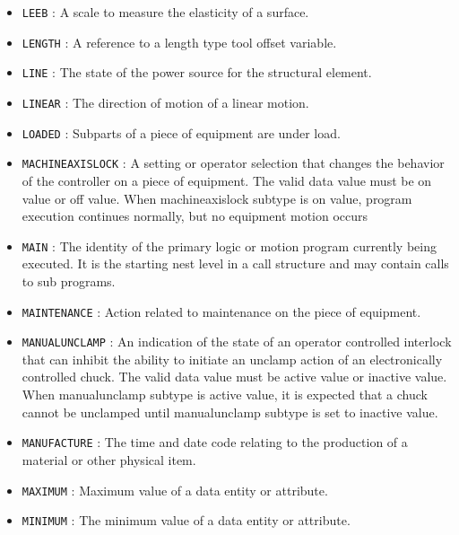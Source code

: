 \begin{itemize}
\item \texttt{LEEB} : A scale to measure the elasticity of a surface. 

\item \texttt{LENGTH} : A reference to a length type tool offset variable. 

\item \texttt{LINE} : The state of the power source for the structural element. 

\item \texttt{LINEAR} : The direction of motion of a linear motion. 

\item \texttt{LOADED} : Subparts of a piece of equipment are under load. 

\item \texttt{MACHINE\textunderscore AXIS\textunderscore LOCK} : A setting or operator selection that changes the behavior of the controller on a piece of equipment. 
 The valid data value must be on value or off value. 
 When machineaxislock subtype is on value, program execution continues normally, but no equipment motion occurs  

\item \texttt{MAIN} : The identity of the primary logic or motion program currently being executed. It is the starting nest level in a call structure and may contain calls to sub programs. 

\item \texttt{MAINTENANCE} : Action related to maintenance on the piece of equipment. 

\item \texttt{MANUAL\textunderscore UNCLAMP} : An indication of the state of an operator controlled interlock that can inhibit the ability to initiate an unclamp action of an electronically controlled chuck.
 The valid data value must be active value or inactive value. 
 When manualunclamp subtype is active value, it is expected that a chuck cannot be unclamped until manualunclamp subtype is set to inactive value.  

\item \texttt{MANUFACTURE} : The time and date code relating to the production of a material or other physical item. 

\item \texttt{MAXIMUM} : Maximum value of a data entity or attribute. 

\item \texttt{MINIMUM} : The minimum value of a data entity or attribute. 


\end{itemize}
